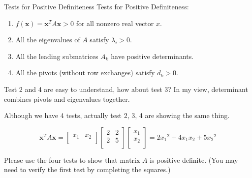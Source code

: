 \documentclass{beamer}
\begin{document}
\begin{frame}{Tests for Positive Definiteness}
    Tests for Positive Definiteness:
\begin{enumerate}
    \item $f\left( \mathbf{x} \right) =\mathbf{x}^TA\mathbf{x}>0$ for all nonzero real vector $x$.
    \item All the eigenvalues of $A$ satisfy $\lambda _i>0$.
    \item All the leading submatrices $A_k$ have positive determinants.
    \item All the pivots (without row exchanges) satisfy $d_k>0$.
\end{enumerate}

\vspace{3pt}
Test 2 and 4 are easy to understand, how about test 3? In my view, determinant combines pivots and eigenvalues together.

\vspace{3pt}
Although we have 4 tests, actually test 2, 3, 4 are showing the same thing.

\begin{equation*}
    \mathbf{x}^TA\mathbf{x}=\left[ \begin{matrix}
        x_1&		x_2\\
    \end{matrix} \right] \left[ \begin{matrix}
        2&		2\\
        2&		5\\
    \end{matrix} \right] \left[ \begin{array}{c}
        x_1\\
        x_2\\
    \end{array} \right] =2{x_1}^2+4x_1x_2+5{x_2}^2
\end{equation*}

Please use the four tests to show that matrix $A$ is positive definite. (You may need to verify the first test by completing the squares.)

\end{frame}
\end{document}
